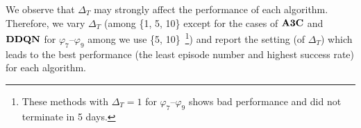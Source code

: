 %
We observe that $\Delta_{T}$ may strongly affect the performance of each algorithm.
Therefore, we
vary $\Delta_{T}$ (among \{1, 5, 10\} except for the cases of $\mathbf{A3C}$ and $\mathbf{DDQN}$ for $\varphi_7$--$\varphi_9$ among we use \{5, 10\}~\footnote{These methods with $\Delta_{T}=1$ for $\varphi_7$--$\varphi_9$ shows bad performance and did not terminate in 5 days.}) and report the setting (of $\Delta_{T}$) which leads to the best performance (the least episode number and highest success rate) for each algorithm.



